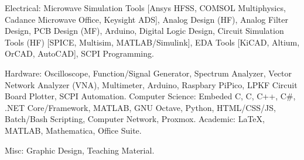 

\begin{cvskills}

  \cvskill
    {Electrical:} %
    {Microwave Simulation Tools [Ansys HFSS, COMSOL Multiphysics, Cadance Microwave Office, Keysight ADS], Analog Design (HF), Analog Filter Design, PCB Design (MF), Arduino, Digital Logic Design, Circuit Simulation Tools (HF) [SPICE, Multisim, MATLAB/Simulink], EDA Tools [KiCAD, Altium, OrCAD, AutoCAD], SCPI Programming.} %

\cvskill
    {Hardware:}
    {Oscilloscope, Function/Signal Generator, Spectrum Analyzer, Vector Network Analyzer (VNA), Multimeter, Arduino, Raspbary PiPico, LPKF Circuit Board Plotter, SCPI Automation. }
  \cvskill
    {Computer Science:} %
    {Embeded C, C, C++, C\#, .NET Core/Framework, MATLAB, GNU Octave, Python, HTML/CSS/JS, Batch/Bash Scripting, Computer Network, Proxmox.} %
  \cvskill
    {Academic:} %
    {\LaTeX, MATLAB, Mathematica, Office Suite.} %


  \cvskill
    {Misc:} %
    {Graphic Design, Teaching Material.} %
\end{cvskills}